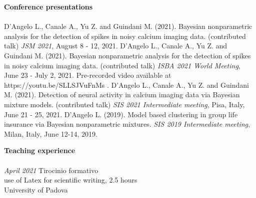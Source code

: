 \documentclass[10pt]{amsart}
\begin{document}
	
	{\large {\bf Conference presentations}} \\[-.08cm] 	\underline{\hspace{6in}}\\[.2cm] 
	D'Angelo L., Canale A., Yu Z. and Guindani M. (2021). Bayesian nonparametric analysis for the detection of spikes in noisy calcium imaging data. (contributed talk) \textit{JSM 2021}, August 8 - 12, 2021. 
	\newline
	\newline
	D'Angelo L., Canale A., Yu Z. and Guindani M. (2021). Bayesian nonparametric analysis for the detection of spikes in noisy calcium imaging data. (contributed talk) \textit{ISBA 2021 World Meeting}, June 23 - July 2, 2021. Pre-recorded video available at https://youtu.be/SLLSJVuFnMs .
	\newline
	\newline
	D'Angelo L., Canale A., Yu Z. and Guindani M. (2021). Detection of neural activity in calcium imaging data via Bayesian mixture models. (contributed talk) \textit{SIS 2021 Intermediate meeting}, Pisa, Italy, June 21 - 25, 2021.
	\newline
	\newline
	D'Angelo L. (2019). Model based clustering in group life insurance via Bayesian nonparametric mixtures. \textit{SIS 2019 Intermediate meeting}, Milan, Italy, June 12-14, 2019.
	\newline
	\newline
	\newline
	
	
	
	
	
	

	
	{\large {\bf Teaching experience}} \\[-.08cm] 
	\underline{\hspace{6in}} \\[.2cm] 
	{\it April 2021}\newline
	 Tirocinio formativo\\
	 use of Latex for scientific writing, 2.5 hours\\
	 University of Padova
	 \newline\newline


	  
\end{document}

